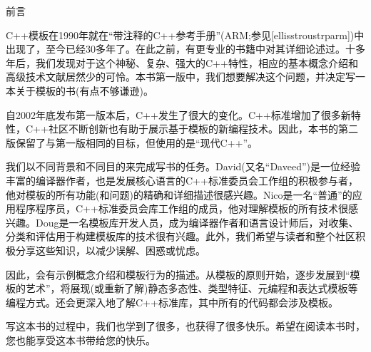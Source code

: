 
\begin{flushright}
 前言
\end{flushright}

C++模板在1990年就在“带注释的C++参考手册”(ARM;参见[ellisstroustrparm])中出现了，至今已经30多年了。在此之前，有更专业的书籍中对其详细论述过。十多年后，我们发现对于这个神秘、复杂、强大的C++特性，相应的基本概念介绍和高级技术文献居然少的可怜。本书第一版中，我们想要解决这个问题，并决定写一本关于模板的书(有点不够谦逊)。

自2002年底发布第一版本后，C++发生了很大的变化。C++标准增加了很多新特性，C++社区不断创新也有助于展示基于模板的新编程技术。因此，本书的第二版保留了与第一版相同的目标，但使用的是“现代C++”。

我们以不同背景和不同目的来完成写书的任务。David(又名“Daveed”)是一位经验丰富的编译器作者，也是发展核心语言的C++标准委员会工作组的积极参与者，他对模板的所有功能(和问题)的精确和详细描述很感兴趣。Nico是一名“普通”的应用程序程序员，C++标准委员会库工作组的成员，他对理解模板的所有技术很感兴趣。Doug是一名模板库开发人员，成为编译器作者和语言设计师后，对收集、分类和评估用于构建模板库的技术很有兴趣。此外，我们希望与读者和整个社区积极分享这些知识，以减少误解、困惑或忧虑。

因此，会有示例概念介绍和模板行为的描述。从模板的原则开始，逐步发展到“模板的艺术”，将展现(或重新了解)静态多态性、类型特征、元编程和表达式模板等编程方式。还会更深入地了解C++标准库，其中所有的代码都会涉及模板。

写这本书的过程中，我们也学到了很多，也获得了很多快乐。希望在阅读本书时，您也能享受这本书带给您的快乐。